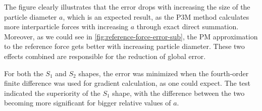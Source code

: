 The figure clearly illustrates that the error drops with increasing the size of the particle diameter $a$, which is an expected result, as the P3M method calculates more interparticle forces with increasing $ a$ through exact direct summation.
Moreover, as we could see in \autoref{fig:reference-force-error-sub}, the PM approximation to the reference force gets better with increasing particle diameter.
These two effects combined are responsible for the reduction of global error.

For both the $S_1$ and $S_2$ shapes, the error was minimized when the fourth-order finite difference was used for gradient calculation, as one could expect.
The test indicated the superiority of the $S_1$ shape, with the difference between the two becoming more significant for bigger relative values of $a$.
